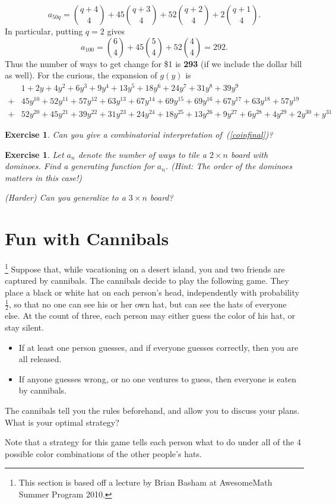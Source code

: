 \documentclass[12pt,twoside]{article}
\theoremstyle{norm}
\newtheorem{exr}[thm]{Exercise}
\newcommand{\rc}[1]{\frac{1}{#1}}
\begin{document}
\[
a_{50q}=\binom{q+4}{4} + 45\binom{q+3}{4} + 52\binom{q+2}{4} + 2\binom{q+1}{4}.
\]
In particular, putting $q=2$ gives
\[a_{100}=\binom 64+45\binom 54+52\binom 44=292.\]
Thus the number of ways to get change for \$1 is \textbf{293} (if we include the dollar bill as well). For the curious, the expansion of $g(y)$ is
\begin{align*}
&1+2y+4y^2+6y^3+9y^4+13y^5+18y^6+24y^7+31y^8+39y^9\\
+&45y^{10}+52y^{11}+57y^{12}+63y^{13}+67y^{14}+69y^{15}+69y^{16} +67y^{17} +63y^{18} +57y^{19}\\
+&52y^{20}+45y^{21}+39y^{22}+31y^{23}+24y^{24}+18y^{25}+13y^{26}+9y^{27}+6y^{28}+4y^{29}+2y^{30}+y^{31}
\end{align*}
\begin{exr}
Can you give a combinatorial interpretation of~(\ref{coinfinal})?
\end{exr}
\begin{exr}
Let $a_n$ denote the number of ways to tile a $2\times n$ board with dominoes. Find a generating function for $a_n$. (Hint: The order of the dominoes matters in this case!)

(Harder) Can you generalize to a $3\times n$ board?
\end{exr}
\section{Fun with Cannibals}

\footnote{This section is based off a lecture by Brian Basham at AwesomeMath Summer Program 2010.}
Suppose that, while vacationing on a desert island, you and two friends are captured by cannibals. The cannibals decide to play the following game. They place a black or white hat on each person's head, independently with probability $\rc 2$, so that no one can see his or her own hat, but can see the hats of everyone else. At the count of three, each person may either guess the color of his hat, or stay silent.
\begin{itemize}
\item
If at least one person guesses, and if everyone guesses correctly, then you are all released.
\item 
If anyone guesses wrong, or no one ventures to guess, then everyone is eaten by cannibals.
\end{itemize}
The cannibals tell you the rules beforehand, and allow you to discuss your plans. What is your optimal strategy?

Note that a strategy for this game tells each person what to do under all of the 4 possible color combinations of the other people's hats.
\end{document}
